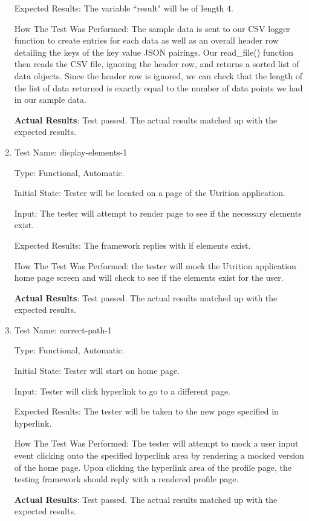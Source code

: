\documentclass[12pt, titlepage]{article}
\begin{document}
\begin{enumerate}
		Expected Results: The variable ``result" will be of length 4.
		
		How The Test Was Performed: The sample data is sent to our CSV logger function to create entries for each data as well as an overall header row detailing the keys of the key value JSON pairings. Our read\_file() function then reads the CSV file, ignoring the header row, and returns a sorted list of data objects. Since the header row is ignored, we can check that the length of the list of data returned is exactly equal to the number of data points we had in our sample data.
		
		\textbf{Actual Results}: Test passed. The actual results matched up with the expected results.
		
		\item{Test Name: display-elements-1}
		
		Type: Functional, Automatic.
		
		Initial State: Tester will be located on a page of the Utrition application.
		
		Input: The tester will attempt to render page to see if the necessary elements exist.
		
		Expected Results: The framework replies with if elements exist.
		
		How The Test Was Performed: the tester will mock the Utrition application home page screen and will check to see if the elements exist for the user.
		
		\textbf{Actual Results}: Test passed. The actual results matched up with the expected results.
		
		\item{Test Name: correct-path-1}
		
		Type: Functional, Automatic.
		
		Initial State: Tester will start on home page.
		
		Input: Tester will click hyperlink to go to a different page.
		
		Expected Results: The tester will be taken to the new page specified in hyperlink.
		
		How The Test Was Performed: The tester will attempt to mock a user input event clicking onto the specified hyperlink area by rendering a mocked version of the home page. Upon clicking the hyperlink area of the profile page, the testing framework should reply with a rendered profile page.
		
		\textbf{Actual Results}: Test passed. The actual results matched up with the expected results.
	\end{enumerate}
\end{document}
